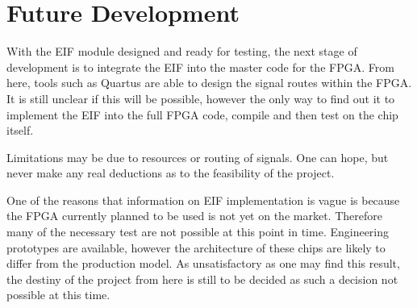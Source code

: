 \section{Future Development}

	With the EIF module designed and ready for testing, the next stage of development is to integrate the EIF into the master code for the FPGA.
	From here, tools such as Quartus are able to design the signal routes within the FPGA.
	It is still unclear if this will be possible, however the only way to find out it to implement the EIF into the full FPGA code, compile and then test on the chip itself.

	Limitations may be due to resources or routing of signals.
	One can hope, but never make any real deductions as to the feasibility of the project.

	One of the reasons that information on EIF implementation is vague is because the FPGA currently planned to be used is not yet on the market.
	Therefore many of the necessary test are not possible at this point in time.
	Engineering prototypes are available, however the architecture of these chips are likely to differ from the production model.
	As unsatisfactory as one may find this result, the destiny of the project from here is still to be decided as such a decision not possible at this time. 